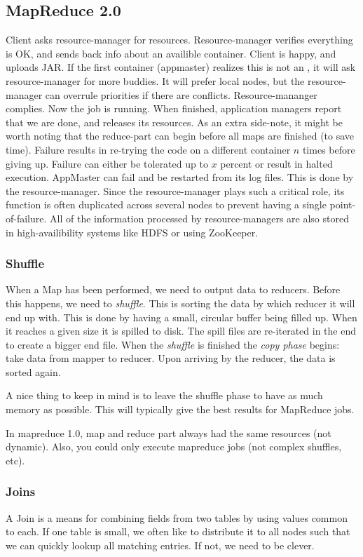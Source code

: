 \subsection{MapReduce 2.0}
Client asks resource-manager for resources.
Resource-manager verifies everything is OK, and sends back info about an availible container. Client is happy, and uploads JAR.
If the first container (appmaster) realizes this is not an , it will ask resource-manager for more buddies. It will prefer local nodes, but the resource-manager can overrule priorities if there are conflicts. Resource-mananger complies.
Now the job is running. When finished, application managers report that we are done, 
and releases its resources. As an extra side-note, it might be worth noting that the
reduce-part can begin before all maps are finished (to save time).
Failure results in re-trying the code on a different container $n$ times before giving up. Failure can either be tolerated up to $x$ percent or result in halted execution.
AppMaster can fail and be restarted from its log files. This is done by the resource-manager. Since the resource-manager plays such a critical role, its function
is often duplicated across several nodes to prevent having a single point-of-failure.
All of the information processed by resource-managers are also stored in high-availibility systems like HDFS or using ZooKeeper.

\subsubsection{Shuffle}
When a Map has been performed, we need to output data to reducers. Before this happens,
we need to \textit{shuffle}. This is sorting the data by which reducer it will end up with. This is done by having a small, circular buffer being filled up. When it reaches
a given size it is spilled to disk. The spill files are re-iterated in the end to create
a bigger end file. When the \textit{shuffle} is finished the \textit{copy phase} begins: take data from mapper to reducer. Upon arriving by the reducer, the data is sorted again.

A nice thing to keep in mind is to leave the shuffle phase to have as much memory as possible. This will typically give the best results for MapReduce jobs.

In mapreduce 1.0, map and reduce part always had the same resources (not dynamic). Also, you could only execute mapreduce jobs (not complex shuffles, etc).

\subsubsection{Joins}
A Join is a means for combining fields from two tables by using values common to each.
If one table is small, we often like to distribute it to all nodes such that we 
can quickly lookup all matching entries. If not, we need to be clever.


